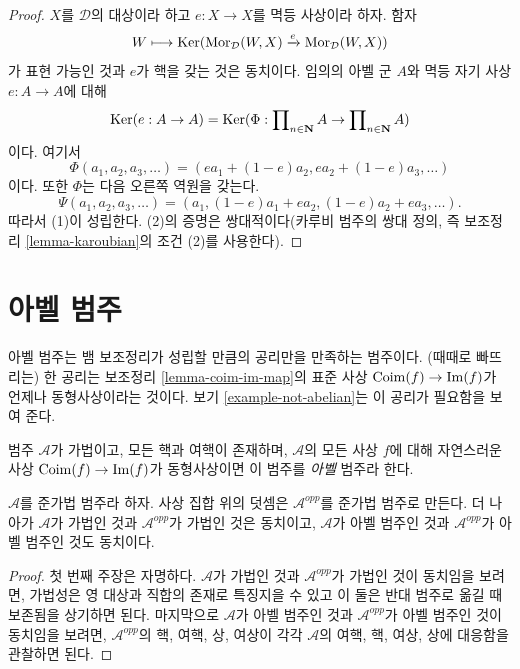 \begin{proof}
$X$를 $\mathcal{D}$의 대상이라 하고 $e : X \to X$를 멱등 사상이라 하자.
함자
$$
W \longmapsto \mathop{\mathrm{Ker}}(
\mathop{\mathrm{Mor}}\nolimits_\mathcal{D}(W, X)
\xrightarrow{e}
\mathop{\mathrm{Mor}}\nolimits_\mathcal{D}(W, X)
)
$$
가 표현 가능인 것과 $e$가 핵을 갖는 것은 동치이다. 임의의 아벨 군 $A$와
멱등 자기 사상 $e : A \to A$에 대해
$$
\mathop{\mathrm{Ker}}(e : A \to A)
= \mathop{\mathrm{Ker}}(\Phi :
\prod\nolimits_{n \in \mathbf{N}} A
\to
\prod\nolimits_{n \in \mathbf{N}} A
)
$$
이다. 여기서
$$
\Phi(a_1, a_2, a_3, \ldots) = (ea_1 + (1 - e)a_2, ea_2 + (1 - e)a_3, \ldots)
$$
이다. 또한 $\Phi$는 다음 오른쪽 역원을 갖는다.
$$
\Psi(a_1, a_2, a_3, \ldots) =
(a_1, (1 - e)a_1 + ea_2, (1 - e)a_2 + ea_3, \ldots).
$$
따라서 (1)이 성립한다. (2)의 증명은 쌍대적이다(카루비 범주의 쌍대 정의,
즉 보조정리 \ref{lemma-karoubian}의 조건 (2)를 사용한다).
\end{proof}



\section{아벨 범주}
\label{section-abelian-categories}

\noindent
아벨 범주는 뱀 보조정리가 성립할 만큼의 공리만을 만족하는 범주이다.
(때때로 빠뜨리는) 한 공리는 보조정리 \ref{lemma-coim-im-map}의 표준 사상
$\mathop{\mathrm{Coim}}(f) \to \mathop{\mathrm{Im}}(f)$가 언제나 동형사상이라는 것이다.
보기 \ref{example-not-abelian}는 이 공리가 필요함을 보여 준다.

\begin{definition}
\label{definition-abelian-category}
범주 $\mathcal{A}$가 가법이고, 모든 핵과 여핵이 존재하며,
$\mathcal{A}$의 모든 사상 $f$에 대해 자연스러운 사상
$\mathop{\mathrm{Coim}}(f) \to \mathop{\mathrm{Im}}(f)$가 동형사상이면 이 범주를 {\it 아벨} 범주라 한다.
\end{definition}

\begin{lemma}
\label{lemma-abelian-opposite}
$\mathcal{A}$를 준가법 범주라 하자. 사상 집합 위의 덧셈은
$\mathcal{A}^{opp}$를 준가법 범주로 만든다. 더 나아가
$\mathcal{A}$가 가법인 것과 $\mathcal{A}^{opp}$가 가법인 것은 동치이고,
$\mathcal{A}$가 아벨 범주인 것과 $\mathcal{A}^{opp}$가 아벨 범주인 것도
동치이다.
\end{lemma}

\begin{proof}
첫 번째 주장은 자명하다. $\mathcal{A}$가 가법인 것과
$\mathcal{A}^{opp}$가 가법인 것이 동치임을 보려면, 가법성은 영 대상과
직합의 존재로 특징지을 수 있고 이 둘은 반대 범주로 옮길 때 보존됨을
상기하면 된다. 마지막으로 $\mathcal{A}$가 아벨 범주인 것과
$\mathcal{A}^{opp}$가 아벨 범주인 것이 동치임을 보려면,
$\mathcal{A}^{opp}$의 핵, 여핵, 상, 여상이 각각 $\mathcal{A}$의 여핵, 핵,
여상, 상에 대응함을 관찰하면 된다.
\end{proof}

